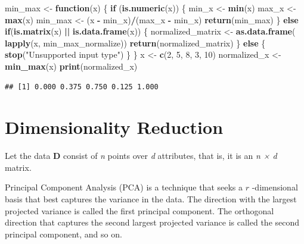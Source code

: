 \documentclass[a4paper,conference]{IEEEtran}
\newenvironment{Shaded}{\begin{snugshade}}{\end{snugshade}}
\newcommand{\ControlFlowTok}[1]{\textcolor[rgb]{0.13,0.29,0.53}{\textbf{#1}}}
\newcommand{\DecValTok}[1]{\textcolor[rgb]{0.00,0.00,0.81}{#1}}
\newcommand{\FunctionTok}[1]{\textcolor[rgb]{0.13,0.29,0.53}{\textbf{#1}}}
\newcommand{\NormalTok}[1]{#1}
\newcommand{\OtherTok}[1]{\textcolor[rgb]{0.56,0.35,0.01}{#1}}
\newcommand{\SpecialCharTok}[1]{\textcolor[rgb]{0.81,0.36,0.00}{\textbf{#1}}}
\newcommand{\StringTok}[1]{\textcolor[rgb]{0.31,0.60,0.02}{#1}}
\begin{document}
\begin{Shaded}
\begin{Highlighting}[]
\NormalTok{min\_max }\OtherTok{\textless{}{-}} \ControlFlowTok{function}\NormalTok{(x) \{}
  \ControlFlowTok{if}\NormalTok{ (}\FunctionTok{is.numeric}\NormalTok{(x)) \{}
\NormalTok{    min\_x }\OtherTok{\textless{}{-}} \FunctionTok{min}\NormalTok{(x)}
\NormalTok{    max\_x }\OtherTok{\textless{}{-}} \FunctionTok{max}\NormalTok{(x)}
\NormalTok{    min\_max }\OtherTok{\textless{}{-}}\NormalTok{ (x }\SpecialCharTok{{-}}\NormalTok{ min\_x)}\SpecialCharTok{/}\NormalTok{(max\_x }\SpecialCharTok{{-}}\NormalTok{ min\_x)}
    \FunctionTok{return}\NormalTok{(min\_max)}
\NormalTok{  \} }\ControlFlowTok{else} \ControlFlowTok{if}\NormalTok{(}\FunctionTok{is.matrix}\NormalTok{(x) }\SpecialCharTok{||} \FunctionTok{is.data.frame}\NormalTok{(x))}
\NormalTok{    \{}
\NormalTok{    normalized\_matrix }\OtherTok{\textless{}{-}} \FunctionTok{as.data.frame}\NormalTok{(}
      \FunctionTok{lapply}\NormalTok{(x, min\_max\_normalize))}
    \FunctionTok{return}\NormalTok{(normalized\_matrix)}
\NormalTok{  \} }\ControlFlowTok{else}\NormalTok{ \{}
    \FunctionTok{stop}\NormalTok{(}\StringTok{"Unsupported input type"}\NormalTok{)}
\NormalTok{  \}}
\NormalTok{\}}
\NormalTok{x }\OtherTok{\textless{}{-}} \FunctionTok{c}\NormalTok{(}\DecValTok{2}\NormalTok{, }\DecValTok{5}\NormalTok{, }\DecValTok{8}\NormalTok{, }\DecValTok{3}\NormalTok{, }\DecValTok{10}\NormalTok{)}
\NormalTok{normalized\_x }\OtherTok{\textless{}{-}} \FunctionTok{min\_max}\NormalTok{(x)}
\FunctionTok{print}\NormalTok{(normalized\_x)}
\end{Highlighting}
\end{Shaded}

\begin{verbatim}
## [1] 0.000 0.375 0.750 0.125 1.000
\end{verbatim}

\hypertarget{sec:dimensionality-reduction}{%
\section{Dimensionality Reduction}\label{sec:dimensionality-reduction}}

Let the data \textbf{D} consist of \emph{n} points over \emph{d}
attributes, that is, it is an \emph{n × d} matrix.

Principal Component Analysis (PCA) is a technique that seeks a \(r\)
-dimensional basis that best captures the variance in the data. The
direction with the largest projected variance is called the first
principal component. The orthogonal direction that captures the second
largest projected variance is called the second principal component, and
so on.
\end{document}

